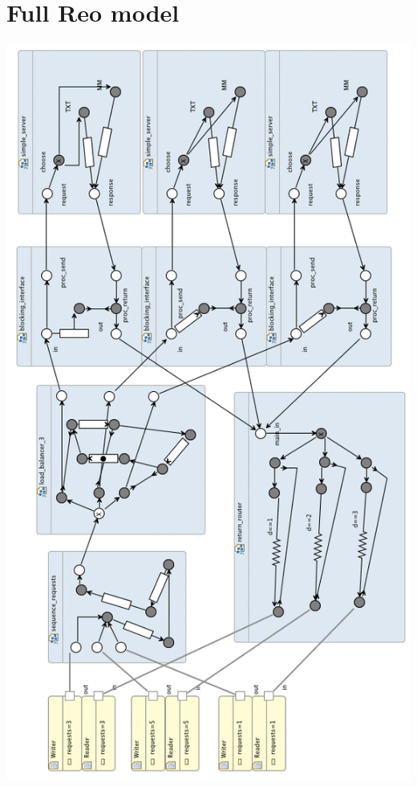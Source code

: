 \documentclass[a4paper]{article}
\newcommand{\re}{Reo\xspace}
\begin{document}
\appendix
\section{Full \re model}\label{app:reo}


    \begin{center}
        \includegraphics[height=0.95\textheight]{images/reo-full.png}
    \end{center}
\end{document}
